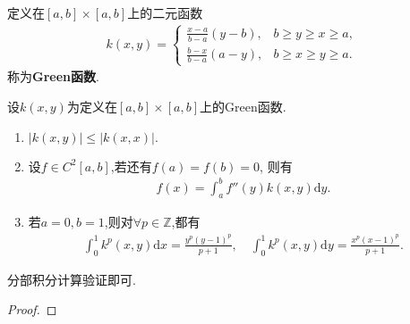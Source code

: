 \documentclass[../../main.tex]{subfiles}
\begin{document}
\begin{definition}[Green函数]
定义在$[a,b]\times [a,b]$上的二元函数
\begin{align*}
k(x,y) = 
\begin{cases}
\frac{x-a}{b-a} (y-b), & b \geqslant  y \geqslant  x \geqslant  a, \\
\frac{b-x}{b-a} (a-y), & b \geqslant  x \geqslant  y \geqslant  a.
\end{cases}
\end{align*}
称为\textbf{Green函数}.
\end{definition}

\begin{theorem}[Green函数的性质]\label{theorem:Green函数的性质}
设$k(x,y)$为定义在$[a,b]\times [a,b]$上的Green函数.
\begin{enumerate}[(1)]
\item $|k(x,y)|\leqslant |k(x,x)|.$

\item 设$f\in C^2[a,b]$,若还有$f(a) = f(b) = 0$, 则有
\begin{align*}
f(x) = \int_{a}^{b} f''(y) k(x,y) \mathrm{d}y.
\end{align*}

\item 若$a=0,b=1$,则对$\forall p\in \mathbb{Z}$,都有
\begin{gather*}
\int_0^1{k^p\left( x,y \right) \mathrm{d}x}=\frac{y^p\left( y-1 \right) ^p}{p+1},
\quad 
\int_0^1{k^p\left( x,y \right) \mathrm{d}y}=\frac{x^p\left( x-1 \right) ^p}{p+1}.
\end{gather*}
\end{enumerate}
\end{theorem}
\begin{note}
分部积分计算验证即可.
\end{note}
\begin{proof}


\end{proof}
\end{document}
